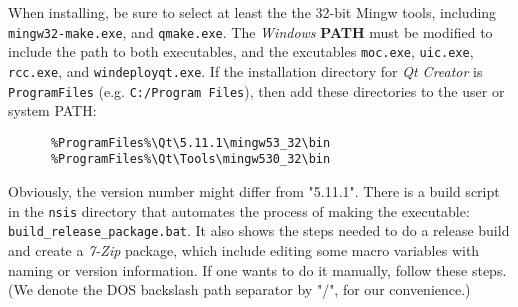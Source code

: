    When installing, be sure to select at least the the 32-bit Mingw tools,
   including \texttt{mingw32-make.exe}, and
   \texttt{qmake.exe}.  The \textsl{Windows}
   \textbf{PATH} must be modified to
   include the path to both executables, and the excutables
   \texttt{moc.exe}, \texttt{uic.exe}, \texttt{rcc.exe}, and
   \texttt{windeployqt.exe}.
   If the installation directory for \textsl{Qt Creator} is
   \texttt{ProgramFiles} (e.g. \texttt{C:/Program Files}), then add
   these directories to the user or system PATH:

   \begin{verbatim}
      %ProgramFiles%\Qt\5.11.1\mingw53_32\bin
      %ProgramFiles%\Qt\Tools\mingw530_32\bin
   \end{verbatim}

   Obviously, the version number might differ from "5.11.1".
   There is a build script in the \texttt{nsis} directory that
   automates the process of making the executable:
   \texttt{build\_release\_package.bat}.
   It also shows the steps needed to do a release build and create a
   \textsl{7-Zip} package, which include editing some macro variables with
   naming or version information.  If one wants to do it manually,
   follow these steps.  (We denote the DOS backslash path separator
   by "/", for our convenience.)

